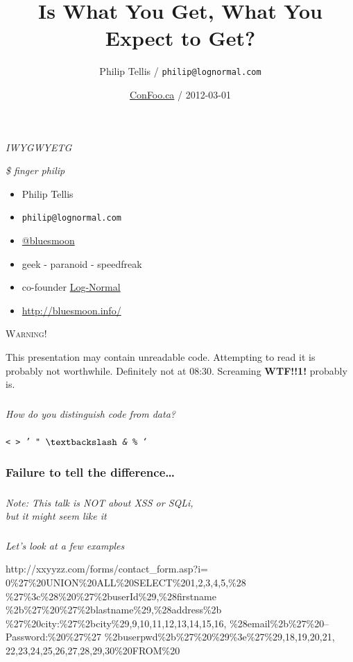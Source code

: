 \documentclass{beamer}
\author{Philip Tellis / \texttt{philip@lognormal.com}}
\title{Is What You Get, What You Expect to Get?}
\date{\href{http://confoo.ca/}{ConFoo.ca} / 2012-03-01}
\newcommand{\innersplash}[1]{
  \begin{center}
    \large \textrm{\textit{ #1 } }
  \end{center}
}
\newcommand{\splashslide}[2][{}]{
  \begin{frame}
  \frametitle{#1}
  \innersplash{#2}
  \end{frame}
}
\begin{document}
\begin{frame}
  \titlepage
\end{frame}

\splashslide{IWYGWYETG}


\begin{frame}{\textit{\$ finger philip}}
  \begin{itemize}
  \item Philip Tellis
  \item \small{\texttt{philip@lognormal.com}}
  \item \href{http://twitter.com/bluesmoon}{@bluesmoon}
  \item geek - paranoid - speedfreak
  \item co-founder \href{http://www.lognormal.com/}{Log-Normal}
  \item \href{http://bluesmoon.info/}{http://bluesmoon.info/}
  \end{itemize}
\end{frame}


\begin{frame}
\begin{center}
\textsc{\Huge Warning!}
\end{center}
\vspace{0.5cm}
\small
This presentation may contain unreadable code.  Attempting to read it
is probably not worthwhile.  Definitely not at 08:30.  Screaming \textbf{WTF!!1!}
probably is.
\end{frame}

\splashslide{\Large{How do you distinguish code from data?}}

\splashslide{\Huge{\texttt{< > ' " $\textbackslash$ \& \% `}}}

\begin{frame}
\frametitle{Failure to tell the difference\ldots}
\end{frame}

\splashslide{\Large Note: This talk is NOT about XSS or SQLi, \\ but it might seem like it}

\splashslide{Let's look at a few examples}

\begin{frame}[fragile]
\begin{semiverbatim}
http://xxyyzz.com/forms/contact\_form.asp?i=
  0\%27\%20UNION\%20ALL\%20SELECT\%201,2,3,4,5,\%28
  \%27\%3c\%28\%20\%27\%2buserId\%29,\%28firstname
  \%2b\%27\%20\%27\%2blastname\%29,\%28address\%2b
  \%27\%20city:\%27\%2bcity\%29,9,10,11,12,13,14,15,16,
  \%28email\%2b\%27\%20--Password:\%20\%27\%27
  \%2buserpwd\%2b\%27\%20\%29\%3e\%27\%29,18,19,20,21,
  22,23,24,25,26,27,28,29,30\%20FROM\%20
\end{semiverbatim}  
\end{frame}
\end{document}
